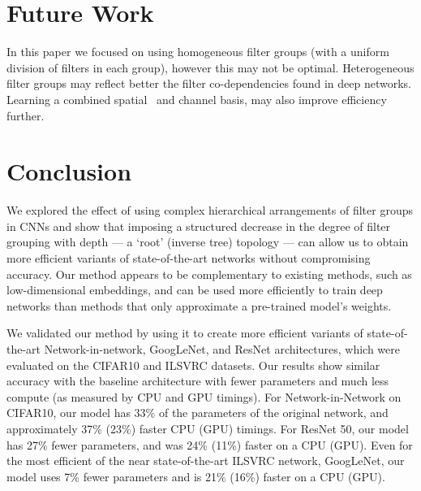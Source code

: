 \documentclass[thesis]{subfiles}
\begin{document}
	\section{Future Work} 
	In this paper we focused on using homogeneous filter groups (with a uniform division of filters in each group), however this may not be optimal. Heterogeneous filter groups may reflect better the filter co-dependencies found in deep networks. Learning a combined spatial~\citep{Ioannou2016} and channel basis, may also improve efficiency further.
	
	\section{Conclusion}
	We explored the effect of using complex hierarchical arrangements of filter groups in CNNs and show that imposing a structured decrease in the degree of filter grouping with depth --- a `root' (inverse tree) topology --- can allow us to obtain more efficient variants of state-of-the-art networks without compromising accuracy. Our method appears to be complementary to existing methods, such as low-dimensional embeddings, and can be used more efficiently to train deep networks than methods that only approximate a pre-trained model's weights.
	
	We validated our method by using it to create more efficient variants of state-of-the-art Network-in-network, GoogLeNet, and ResNet architectures, which were evaluated on the CIFAR10 and ILSVRC datasets. Our results show similar accuracy with the baseline architecture with fewer parameters and much less compute (as measured by CPU and GPU timings). For Network-in-Network on CIFAR10, our model has 33\% of the parameters of the original network, and approximately 37\% (23\%) faster CPU (GPU) timings. For ResNet 50, our model has 27\% fewer parameters, and was 24\% (11\%) faster on a CPU (GPU). 
	Even for the most efficient of the near state-of-the-art ILSVRC network, GoogLeNet, our model uses 7\% fewer parameters and is 21\% (16\%) faster on a CPU (GPU).
	
\end{document}
